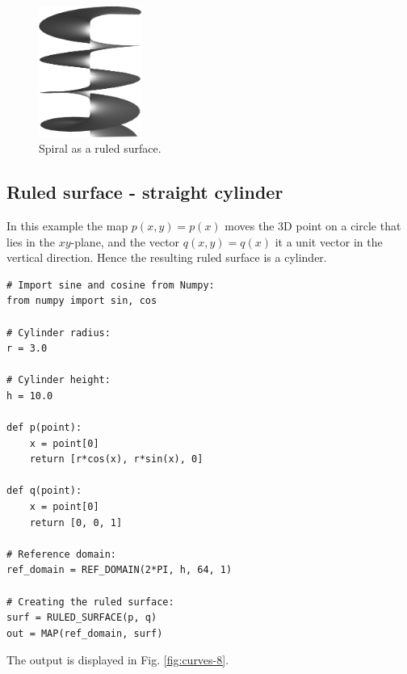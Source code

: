 \begin{figure}[!ht]
\begin{center}
\includegraphics[width=0.3\textwidth]{img/curves-7.png}
\end{center}
\vspace{-4mm}
\caption{Spiral as a ruled surface.}
\label{fig:curves-7}
\end{figure}

\subsection{Ruled surface - straight cylinder}

In this example the map $p(x, y) = p(x)$ moves the 3D point on a circle 
that lies in the $xy$-plane, and the vector $q(x, y) = q(x)$ it a unit vector 
in the vertical direction. Hence the resulting ruled surface is a cylinder. \\

\begin{bbox}
\begin{verbatim}
# Import sine and cosine from Numpy:
from numpy import sin, cos

# Cylinder radius:
r = 3.0

# Cylinder height:
h = 10.0

def p(point):
    x = point[0]
    return [r*cos(x), r*sin(x), 0]
  
def q(point):
    x = point[0]
    return [0, 0, 1]

# Reference domain:  
ref_domain = REF_DOMAIN(2*PI, h, 64, 1)

# Creating the ruled surface:
surf = RULED_SURFACE(p, q)
out = MAP(ref_domain, surf)
\end{verbatim}
\end{bbox}
\vspace{6mm}

\noindent
The output is displayed in Fig. \ref{fig:curves-8}.\\

